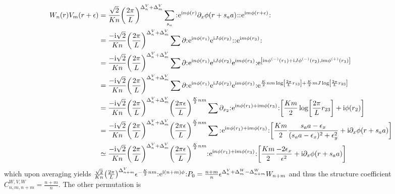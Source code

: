 \documentclass[english, parskip=full]{scrartcl}
\begin{document}
\begin{align}
W_n(r) V_m(r+\epsilon) &= \frac{\sqrt{2}}{Kn} \kla*{\frac{2\pi}{L}}^{\Delta^V_n + \Delta^V_m} \sum_{s_a} \normord{\powe{\i n\phi(r)} \partial_x\phi(r+s_aa)} \normord{\powe{\i m\phi(r+\epsilon)}}\\
&= \frac{-\i \sqrt{2}}{Kn} \kla*{\frac{2\pi}{L}}^{\Delta^V_n + \Delta^V_m} \sum \partial \normord{\powe{\i n\phi(r_1)} \powe{\i J\phi(r_2)}} \normord{\powe{\i m\phi(r_3)}}\\
&= \frac{-\i \sqrt{2}}{Kn} \kla*{\frac{2\pi}{L}}^{\Delta^V_n + \Delta^V_m} \sum \partial \normord{\powe{\i n\phi(r_1)} \powe{\i J\phi(r_2)} \powe{\i m\phi(r_3)}} \powe{\klb*{\i n\phi^{(-)}(r_1) + \i J \phi^{(-)}(r_2), \i m\phi^{(+)}(r_3)}}\\
&= \frac{-\i \sqrt{2}}{Kn} \kla*{\frac{2\pi}{L}}^{\Delta^V_n + \Delta^V_m} \sum \partial \normord{\powe{\i n\phi(r_1)} \powe{\i J\phi(r_2)} \powe{\i m\phi(r_3)}} \powe{ \frac{K}{2}nm \log\klb*{\frac{2\pi}{L}r_{13}} + \frac{K}{2}mJ \log \klb*{\frac{2\pi}{L} r_{23}} }\\
&= \frac{-\i \sqrt{2}}{Kn} \kla*{\frac{2\pi}{L}}^{\Delta^V_n + \Delta^V_m} \kla*{\frac{2\pi\epsilon}{L}}^{\frac{K}{2}nm} \sum \partial_{x_2} \normord{\powe{\i n\phi(r_1)+\i m\phi(r_3)}} \klb*{\frac{Km}{2} \log \klb*{\frac{2\pi}{L} r_{23}} + \i \phi(r_2)} \\
&= \frac{-\i \sqrt{2}}{Kn} \kla*{\frac{2\pi}{L}}^{\Delta^V_n + \Delta^V_m} \kla*{\frac{2\pi\epsilon}{L}}^{\frac{K}{2}nm} \sum \normord{\powe{\i n\phi(r_1)+\i m\phi(r_3)}} \klb*{ \frac{Km}{2} \frac{s_aa - \epsilon_x}{(s_aa - \epsilon_x)^2 + \epsilon_y^2} + \i \partial_x\phi(r + s_aa)}\\
&\simeq \frac{-\i \sqrt{2}}{Kn} \kla*{\frac{2\pi}{L}}^{\Delta^V_n + \Delta^V_m} \kla*{\frac{2\pi\epsilon}{L}}^{\frac{K}{2}nm} \normord{\powe{\i n\phi(r_1)+\i m\phi(r_3)}} \klb*{ \frac{Km}{2} \frac{-2\epsilon_x}{\epsilon^2} + \i \partial_x \phi(r + s_aa)}
\end{align}
which upon averaging yields $\frac{\sqrt{2}}{Kn} \kla*{\frac{2\pi}{L}}^{\Delta_{n+m}^V} \epsilon^{-\frac{K}{2}nm} \normord{\powe{\i (n+m)\phi}} P_0 = \frac{n+m}{n} \epsilon^{\Delta^V_n + \Delta^W_m - \Delta^W_{n+m}}  W_{n+m}$ and thus the structure coefficient $C^{W,V,W}_{n,m,n+m} = \frac{n+m}{n}$.
The other permutation is
\end{document}

